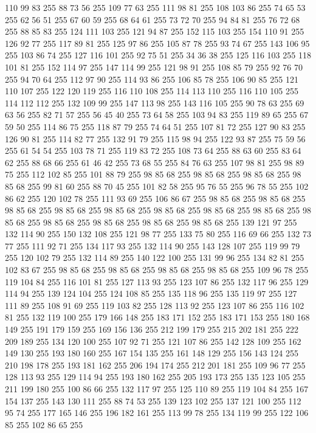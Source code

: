 110 99 83 255 88 73 56 255 109 77 63 255 111 98 81 255 108 103 86 255 74 65 53 255 62 56 51 255 67 60 59 255 68 64 61 255 73 72 70 255 94 84 81 255 76 72 68 255 88 85 83 255 124 111 103 255 121 94 87 255 152 115 103 255 154 110 91 255 126 92 77 255 117 89 81 255 125 97 86 255 105 87 78 255 93 74 67 255 143 106 95 255 103 86 74 255 127 116 101 255 92 75 51 255 34 36 38 255 125 116 103 255 118 101 81 255 152 114 97 255 147 114 99 255 121 98 91 255 108 85 79 255 92 76 70 255 94 70 64 255 112 97 90 255 114 93 86 255 106 85 78 255 106 90 85 255 121 110 107 255 122 120 119 255 116 110 108 255 114 113 110 255 116 110 105 255 114 112 112 255 132 109 99 255 147 113 98 255 143 116 105 255 90 78 63 255 69 63 56 255 82 71 57 255 56 45 40 255 73 64 58 255 103 94 83 255 119 89 65 255 67 59 50 255 114 86 75 255 118 87 79 255 74 64 51 255 107 81 72 255 127 90 83 255 126 90 81 255 114 82 77 255 132 91 79 255
115 98 94 255 122 93 87 255 75 59 56 255 61 54 54 255 103 78 71 255 119 83 72 255 108 73 64 255 88 63 60 255 83 64 62 255 88 68 66 255 61 46 42 255 73 68 55 255 84 76 63 255 107 98 81 255 98 89 75 255 112 102 85 255 101 88 79 255 98 85 68 255 98 85 68 255 98 85 68 255 98 85 68 255 99 81 60 255 88 70 45 255 101 82 58 255 95 76 55 255 96 78 55 255 102 86 62 255 120 102 78 255 111 93 69 255 106 86 67 255 98 85 68 255 98 85 68 255 98 85 68 255 98 85 68 255 98 85 68 255 98 85 68 255 98 85 68 255 98 85 68 255 98 85 68 255 98 85 68 255 98 85 68 255 98 85 68 255 98 85 68 255 139 121 97 255 132 114 90 255 150 132 108 255 121 98 77 255 133 75 80 255 116 69 66 255 132 73 77 255 111 92 71 255 134 117 93 255 132 114 90 255 143 128 107 255 119 99 79 255 120 102 79 255 132 114 89 255 140 122 100 255 131 99 96 255 134 82 81 255 102 83 67 255 98 85 68 255 98 85 68 255 98 85 68 255
98 85 68 255 109 96 78 255 119 104 84 255 116 101 81 255 127 113 93 255 123 107 86 255 132 117 96 255 129 114 94 255 139 124 104 255 124 108 85 255 135 118 96 255 135 119 97 255 127 111 89 255 108 91 69 255 119 103 82 255 128 113 92 255 123 107 86 255 116 102 81 255 132 119 100 255 179 166 148 255 183 171 152 255 183 171 153 255 180 168 149 255 191 179 159 255 169 156 136 255 212 199 179 255 215 202 181 255 222 209 189 255 134 120 100 255 107 92 71 255 121 107 86 255 142 128 109 255 162 149 130 255 193 180 160 255 167 154 135 255 161 148 129 255 156 143 124 255 210 198 178 255 193 181 162 255 206 194 174 255 212 201 181 255 109 96 77 255 128 113 93 255 129 114 94 255 193 180 162 255 205 193 173 255 135 123 105 255 211 199 180 255 100 86 66 255 132 117 97 255 125 110 89 255 119 104 84 255 167 154 137 255 143 130 111 255 88 74 53 255 139 123 102 255 137 121 100 255 112 95 74 255 177 165 146 255 196 182 161 255 113 99 78 255 134 119 99 255 122 106 85 255 102 86 65 255
